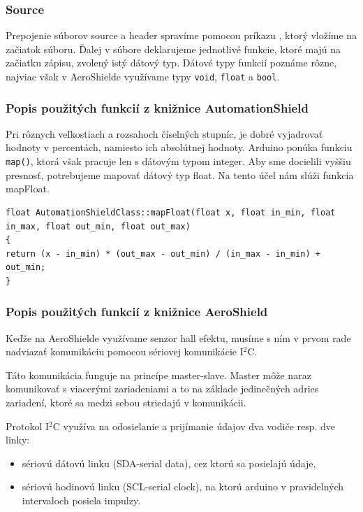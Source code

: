 \subsubsection{Source}

Prepojenie súborov source a header spravíme pomocou príkazu , ktorý vložíme na začiatok súboru. Ďalej v súbore deklarujeme jednotlivé funkcie, ktoré majú na začiatku zápisu, zvolený istý dátový typ. Dátové typy funkcií poznáme rôzne\cite{datovetypy}, najviac však v AeroShielde využívame typy \verb|void|, \verb|float| a \verb|bool|. 


\subsubsection{Popis použitých funkcií z knižnice AutomationShield}

Pri rôznych veľkostiach a rozsahoch číselných stupníc, je dobré vyjadrovať hodnoty v percentách, namiesto ich absolútnej hodnoty. Arduino ponúka funkciu \verb|map()|, ktorá však pracuje len s dátovým typom integer. Aby sme docielili vyššiu presnosť, potrebujeme mapovať dátový typ float. Na tento účel nám slúži funkcia mapFloat. 

\begin{lstlisting}[caption={Zdrojový kód funkcie mapFloat.},captionpos=b]
float AutomationShieldClass::mapFloat(float x, float in_min, float in_max, float out_min, float out_max) 
{
return (x - in_min) * (out_max - out_min) / (in_max - in_min) + out_min; 
}
\end{lstlisting}


\subsubsection{Popis použitých funkcií z knižnice AeroShield}


Keďže na AeroShielde využívame senzor hall efektu, musíme s ním v prvom rade nadviazať komunikáciu pomocou sériovej komunikácie I$^{2}$C.

Táto komunikácia funguje na princípe master-slave. Master môže naraz komunikovať s viacerými zariadeniami a to na základe jedinečných adries zariadení, ktoré sa medzi sebou striedajú v komunikácii.

 Protokol I$^{2}$C využíva na odosielanie a prijímanie údajov dva vodiče resp. dve linky: 
\begin{itemize}
\item sériovú dátovú linku (SDA-serial data), cez ktorú sa posielajú údaje, 
\item sériovú hodinovú linku (SCL-serial clock), na ktorú arduino v pravidelných intervaloch posiela impulzy. 
\end{itemize}

